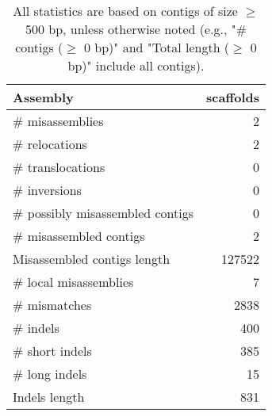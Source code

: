 \documentclass[12pt,a4paper]{article}
\begin{document}
\begin{table}[ht]
\begin{center}
\caption{All statistics are based on contigs of size $\geq$ 500 bp, unless otherwise noted (e.g., "\# contigs ($\geq$ 0 bp)" and "Total length ($\geq$ 0 bp)" include all contigs).}
\begin{tabular}{|l*{1}{|r}|}
\hline
Assembly & scaffolds \\ \hline
\# misassemblies & 2 \\ \hline
\hspace{5mm}\# relocations & 2 \\ \hline
\hspace{5mm}\# translocations & 0 \\ \hline
\hspace{5mm}\# inversions & 0 \\ \hline
\# possibly misassembled contigs & 0 \\ \hline
\# misassembled contigs & 2 \\ \hline
Misassembled contigs length & 127522 \\ \hline
\# local misassemblies & 7 \\ \hline
\# mismatches & 2838 \\ \hline
\# indels & 400 \\ \hline
\hspace{5mm}\# short indels & 385 \\ \hline
\hspace{5mm}\# long indels & 15 \\ \hline
Indels length & 831 \\ \hline
\end{tabular}
\end{center}
\end{table}
\end{document}
